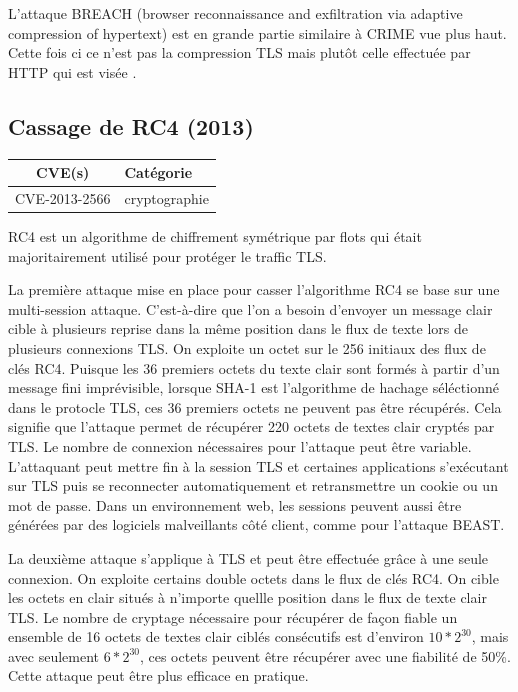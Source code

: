L'attaque BREACH (browser reconnaissance and exfiltration via adaptive compression of hypertext) est en grande partie similaire à CRIME vue plus haut. Cette fois ci ce n'est pas la compression TLS mais plutôt celle effectuée par HTTP qui est visée \cite{breach}.




\subsection{Cassage de RC4 (2013)}

\begin{tabularx}{0.96\textwidth}{|c|X|}
  \hline
  \textbf{CVE(s)} & \textbf{Catégorie} \\
  \hline
  CVE-2013-2566 & cryptographie \\
  \hline
\end{tabularx}

\vspace{1em}


RC4 est un algorithme de chiffrement symétrique par flots qui était majoritairement utilisé pour protéger le traffic TLS.

La première attaque mise en place pour casser l'algorithme RC4 se base sur une multi-session attaque. C'est-à-dire que l'on a besoin d'envoyer un message clair cible à plusieurs reprise dans la même position dans le flux de texte lors de plusieurs connexions TLS. On exploite un octet sur le 256 initiaux des flux de clés RC4. Puisque les 36 premiers octets du texte clair sont formés à partir d'un message fini imprévisible, lorsque SHA-1 est l'algorithme de hachage séléctionné dans le protocle TLS, ces 36 premiers octets ne peuvent pas être récupérés. Cela signifie que l'attaque permet de récupérer 220 octets de textes clair cryptés par TLS. Le nombre de connexion nécessaires pour l'attaque peut être variable. L'attaquant peut mettre fin à la session TLS et certaines applications s'exécutant sur TLS puis se reconnecter automatiquement et retransmettre un cookie ou un mot de passe. Dans un environnement web, les sessions peuvent aussi être générées par des logiciels malveillants côté client, comme pour l'attaque BEAST.

La deuxième attaque s'applique à TLS et peut être effectuée grâce à une seule connexion. On exploite certains double octets dans le flux de clés RC4. On cible les octets en clair situés à n'importe quellle position dans le flux de texte clair TLS. Le nombre de cryptage nécessaire pour récupérer de façon fiable un ensemble de 16 octets de textes clair ciblés consécutifs est d'environ $10*2^{30}$, mais avec seulement $6*2^{30}$, ces octets peuvent être récupérer avec une fiabilité de 50\%. Cette attaque peut être plus efficace en pratique.

